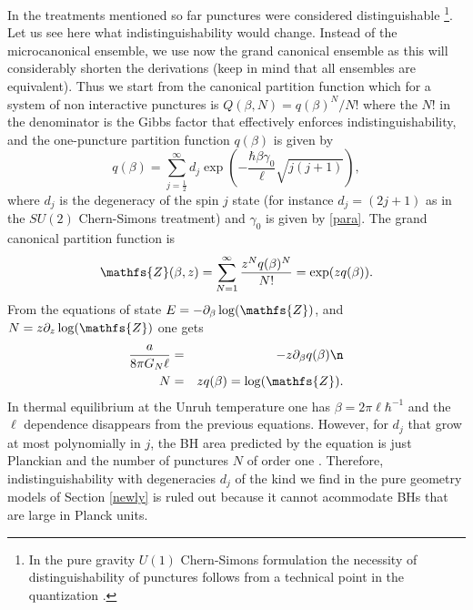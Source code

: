 \documentclass[aps, nofootinbib,superscriptaddress,12pt]{revtex4-2}
\newcommand{\nn}{\sqrt{j(j+1)}}
\def\be{\begin{equation}}
\def\ee{\end{equation}}
\def\ba{\begin{eqnarray}}
\def\ea{\end{eqnarray}}
\newcommand{\mfs}[1]{\mathfs {#1}}                               %
\newcommand{\sZ}{{\mfs Z}}
\begin{document}
In the treatments mentioned so far punctures were considered distinguishable \footnote{In the pure gravity $U(1)$ Chern-Simons formulation the necessity of distinguishability of punctures follows from a technical point in the quantization \cite{Ashtekar:2000eq}.}. Let us see here what indistinguishability would change. Instead of the microcanonical ensemble, we use now the grand canonical ensemble as this will  considerably shorten the derivations 
(keep in mind that all ensembles are equivalent). Thus we start from the canonical partition function which for a system 
of non interactive punctures is $Q(\beta,N)=q(\beta)^N/N!$ where the $N!$ in the denominator is the Gibbs factor
that effectively enforces indistinguishability, and the one-puncture partition function $q(\beta)$ is given by  
\be\label{qqq}
q(\beta)=\sum_{j=\frac{1}{2}}^{\infty} d_j \exp(-\frac{\hbar \beta \gamma_0}{\ell} \nn ),
\ee
where $d_j$ is the degeneracy of the spin $j$ state (for instance $d_j=(2j+1)$ as in 
the $SU(2)$ Chern-Simons treatment) and $\gamma_0$ is given by \eqref{para}. The grand canonical partition function is
\be\label{zzz}
\sZ(\beta,z)=\sum_{N=1}^{\infty} \frac{z^Nq(\beta)^N}{N!}=\exp(zq(\beta)).
\ee
From the equations of state $E=-\partial_{\beta} \log(\sZ)$, and $N=z\partial_z\log(\sZ) $ one gets
\ba\label{eqsta}
\frac{a}{8\pi G_N \ell}&=&-z\partial_{\beta} q(\beta)\n \\
N &=& z q(\beta)=\log(\sZ).
\ea
In thermal equilibrium at the Unruh temperature one has $\beta=2\pi\ell\hbar^{-1}$ and the $\ell$ dependence disappears from the previous equations.
However, for $d_j$ that grow at most polynomially in $j$, the BH area predicted by the equation is just Planckian and the number of punctures $N$ of order one \cite{Ghosh:2013iwa}.
Therefore, indistinguishability with degeneracies $d_j$ of the kind we find in the pure geometry models of Section \ref{newly} is ruled out because it cannot acommodate BHs that are large in Planck units. 
\end{document}
